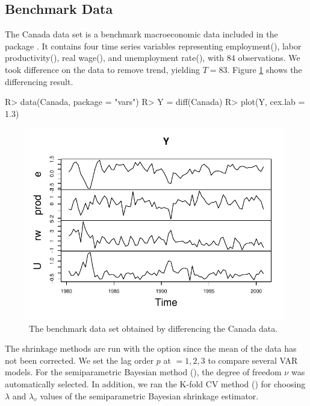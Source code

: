 \documentclass[
]{jss}
\begin{document}
\hypertarget{benchmark-data}{%
\subsection{Benchmark Data}\label{benchmark-data}}

The Canada data set is a benchmark macroeconomic data included in the
package . It contains four time series variables representing
employment(), labor productivity(), real
wage(), and unemployment rate(), with \(84\)
observations. We took difference on the data to remove trend, yielding
\(T = 83\). Figure \ref{fig:diffCanada} shows the differencing result.

\begin{CodeChunk}

\begin{CodeInput}
R> data(Canada, package = "vars")
R> Y = diff(Canada)
R> plot(Y, cex.lab = 1.3)
\end{CodeInput}
\begin{figure}

{\centering \includegraphics{article_jss_varshrink_files/figure-latex/diffCanada-1} 

}

\caption{\label{fig:diffCanada}The benchmark data set obtained by differencing the Canada data.}\label{fig:diffCanada}
\end{figure}
\end{CodeChunk}

The shrinkage methods are run with the option 
since the mean of the data has not been corrected. We set the lag order
\(p\) at  \(= 1, 2, 3\) to compare several VAR models. For the
semiparametric Bayesian method (), the degree of
freedom \(\nu\) was automatically selected. In addition, we ran the
K-fold CV method () for choosing \(\lambda\) and
\(\lambda_v\) values of the semiparametric Bayesian shrinkage estimator.
\end{document}
